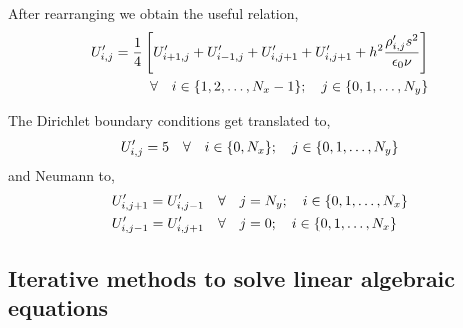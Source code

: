 After rearranging we obtain the useful relation,
\begin{align} \label{eq:difference equation}
    U'_{i,j} = \frac{1}{4} \left[ U'_{i+1,j}+ U'_{i-1,j} + U'_{i,j+1}+ U'_{i,j+1} + h^2\frac{\rho'_{i,j} s^2}{\epsilon_0 \nu} \right] \\ \hspace{0.35cm} \forall \hspace{0.35cm} i \in \{1,2,\dots,N_x-1\} ; \hspace{0.35cm} j \in \{0,1,\dots,N_y\} 
\end{align}

The Dirichlet boundary conditions get translated to,
\begin{align*}
    U'_{i,j} = 5 \hspace{0.35cm} \forall \hspace{0.35cm} i \in \{0,N_x\} ; \hspace{0.35cm} j \in \{0,1,\dots,N_y\}
\end{align*}
and Neumann to,
\begin{align*}
    &U'_{i,j+1} = U'_{i,j-1} \hspace{0.35cm} \forall \hspace{0.35cm} j = N_y ; \hspace{0.35cm} i \in \{0,1,\dots,N_x\} \\
    &U'_{i,j-1} = U'_{i,j+1} \hspace{0.35cm} \forall \hspace{0.35cm} j = 0 ; \hspace{0.35cm} i \in \{0,1,\dots,N_x\} 
\end{align*}
\subsection{Iterative methods to solve linear algebraic equations}


